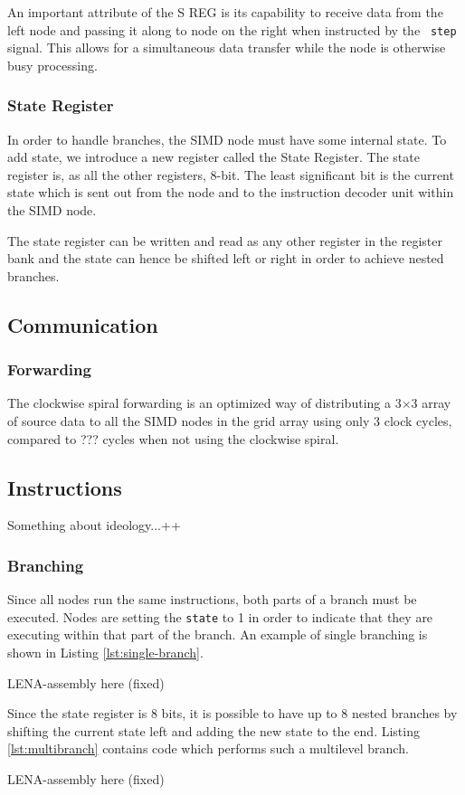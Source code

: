 An important attribute of the S REG is its capability to receive data from the
left node and passing it along to node on the right when instructed by the {\tt
  step} signal. This allows for a simultaneous data transfer while the node is
otherwise busy processing.

\subsubsection{State Register}
In order to handle branches, the \ac{SIMD} node must have some internal
state. To add state, we introduce a new register called the State Register. The
state register is, as all the other registers, 8-bit. The least significant bit
is the current state which is sent out from the node and to the instruction
decoder unit within the \ac{SIMD} node.

The state register can be written and read as any other register in the register
bank and the state can hence be shifted left or right in order to achieve nested
branches.

\subsection{Communication}\label{sec:simd-com}



\subsubsection{Forwarding}
The clockwise spiral forwarding is an optimized way of distributing a 3$\times$3
array of source data to all the \ac{SIMD} nodes in the grid array using only 3
clock cycles, compared to ??? cycles when not using the clockwise
spiral.


\subsection{Instructions}
Something about ideology...++


\subsubsection{Branching}
Since all nodes run the same instructions, both parts of a branch must be
executed. Nodes are setting the {\tt state} to 1 in order to indicate that they
are executing within that part of the branch. An example of single branching is
shown in Listing \ref{lst:single-branch}.

{\sc \color{green} LENA-assembly here (fixed)}

Since the state register is 8 bits, it is possible to have up to 8 nested
branches by shifting the current state left and adding the new state to the
end. Listing \ref{lst:multibranch} contains code which performs such a
multilevel branch.

{\sc \color{green} LENA-assembly here (fixed)}
